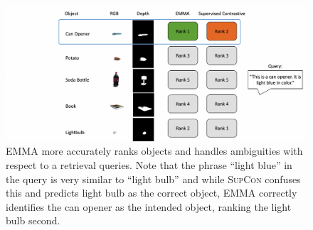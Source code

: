 \documentclass[10pt]{article} %
\newcommand{\todokdinline}[1]{\todo[color=red!20,inline]{{KD: \small #1}}}
\newcommand{\Rephrase}[1]{{\textbf {\color{red}Rephrase please #1}}}
\newcommand{\ours}{\textsc{EMMA}}
\newcommand{\supcon}{\textsc{SupCon}}
\begin{document}
\begin{figure}[h!]
\centering
\includegraphics[width=.99\columnwidth]{Figures/example-rankings-rearranged}
\caption{\ours{} more accurately ranks objects and handles ambiguities with respect to a retrieval queries. Note that the phrase ``light blue'' in the query is very similar to ``light bulb'' and while \supcon{} confuses this and predicts light bulb as the correct object, \ours{} correctly identifies the can opener as the intended object, ranking the light bulb second.}
\label{fig:rankings}
\end{figure}





\end{document}

